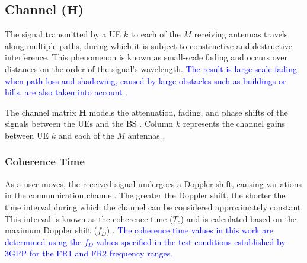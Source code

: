 \subsection{Channel (\texorpdfstring{$\mathbf H$}{H})}\label{subsec:canal}\label{subsubsec:multipercurso}


The signal transmitted by a UE $k$ to each of the $M$ receiving antennas travels along multiple paths, during which it is subject to constructive and destructive interference. This phenomenon is known as small-scale fading and occurs over distances on the order of the signal's wavelength. \textcolor{blue}{The result is large-scale fading when path loss and shadowing, caused by large obstacles such as buildings or hills, are also taken into account \cite{tse-viswanath}.}

The channel matrix $\mathbf{H}$ models the attenuation, fading, and phase shifts of the signals between the UEs and the BS \cite{rodriguezsanchez2020}. Column $k$ represents the channel gains between UE $k$ and each of the $M$ antennas \cite{tse-viswanath}.

\subsubsection{Coherence Time}\label{subsubsec:tempo-coerencia}
As a user moves, the received signal undergoes a Doppler shift, causing variations in the communication channel. The greater the Doppler shift, the shorter the time interval during which the channel can be considered approximately constant. This interval is known as the coherence time ($T_c$) and is calculated based on the maximum Doppler shift ($f_D$) \cite{tse-viswanath}. \textcolor{blue}{The coherence time values in this work are determined using the $f_D$ values specified in the test conditions established by 3GPP \cite{3gpp-ts38104} for the FR1 and FR2 frequency ranges.}
